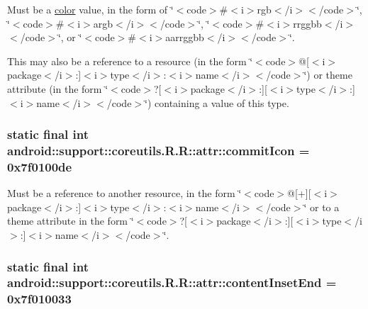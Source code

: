 Must be a \hyperlink{classandroid_1_1support_1_1coreutils_1_1_r_1_1color}{color} value, in the form of \char`\"{}$<$code$>$\#$<$i$>$rgb$<$/i$>$$<$/code$>$\char`\"{}, \char`\"{}$<$code$>$\#$<$i$>$argb$<$/i$>$$<$/code$>$\char`\"{}, \char`\"{}$<$code$>$\#$<$i$>$rrggbb$<$/i$>$$<$/code$>$\char`\"{}, or \char`\"{}$<$code$>$\#$<$i$>$aarrggbb$<$/i$>$$<$/code$>$\char`\"{}. 

This may also be a reference to a resource (in the form \char`\"{}$<$code$>$@\mbox{[}$<$i$>$package$<$/i$>$:\mbox{]}$<$i$>$type$<$/i$>$:$<$i$>$name$<$/i$>$$<$/code$>$\char`\"{}) or theme attribute (in the form \char`\"{}$<$code$>$?\mbox{[}$<$i$>$package$<$/i$>$:\mbox{]}\mbox{[}$<$i$>$type$<$/i$>$:\mbox{]}$<$i$>$name$<$/i$>$$<$/code$>$\char`\"{}) containing a value of this type. \hypertarget{classandroid_1_1support_1_1coreutils_1_1_r_1_1attr_28d39264d30ac4067010f1047cf65599}{
\subsubsection[{commitIcon}]{\setlength{\rightskip}{0pt plus 5cm}static final int android::support::coreutils.R.R::attr::commitIcon = 0x7f0100de}}
\label{classandroid_1_1support_1_1coreutils_1_1_r_1_1attr_28d39264d30ac4067010f1047cf65599}


Must be a reference to another resource, in the form \char`\"{}$<$code$>$@\mbox{[}+\mbox{]}\mbox{[}$<$i$>$package$<$/i$>$:\mbox{]}$<$i$>$type$<$/i$>$:$<$i$>$name$<$/i$>$$<$/code$>$\char`\"{} or to a theme attribute in the form \char`\"{}$<$code$>$?\mbox{[}$<$i$>$package$<$/i$>$:\mbox{]}\mbox{[}$<$i$>$type$<$/i$>$:\mbox{]}$<$i$>$name$<$/i$>$$<$/code$>$\char`\"{}. \hypertarget{classandroid_1_1support_1_1coreutils_1_1_r_1_1attr_f186e4401f833e4181fcbef4789a64c1}{
\subsubsection[{contentInsetEnd}]{\setlength{\rightskip}{0pt plus 5cm}static final int android::support::coreutils.R.R::attr::contentInsetEnd = 0x7f010033}}
\label{classandroid_1_1support_1_1coreutils_1_1_r_1_1attr_f186e4401f833e4181fcbef4789a64c1}


